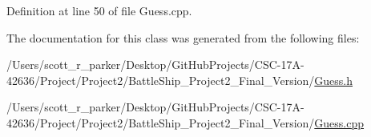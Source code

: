 Definition at line 50 of file Guess.\+cpp.



The documentation for this class was generated from the following files\+:\begin{DoxyCompactItemize}
\item 
/\+Users/scott\+\_\+r\+\_\+parker/\+Desktop/\+Git\+Hub\+Projects/\+C\+S\+C-\/17\+A-\/42636/\+Project/\+Project2/\+Battle\+Ship\+\_\+\+Project2\+\_\+\+Final\+\_\+\+Version/\hyperlink{_guess_8h}{Guess.\+h}\item 
/\+Users/scott\+\_\+r\+\_\+parker/\+Desktop/\+Git\+Hub\+Projects/\+C\+S\+C-\/17\+A-\/42636/\+Project/\+Project2/\+Battle\+Ship\+\_\+\+Project2\+\_\+\+Final\+\_\+\+Version/\hyperlink{_guess_8cpp}{Guess.\+cpp}\end{DoxyCompactItemize}
